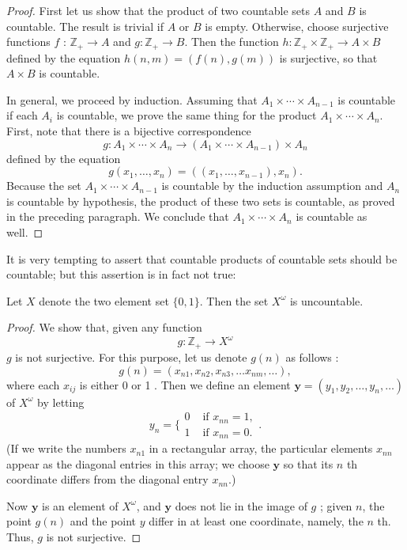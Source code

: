 \begin{proof}
 First let us show that the product of two countable sets \(A\) and \(B\) is countable. The result is trivial if \(A\) or \(B\) is empty. Otherwise, choose surjective functions \(f\) : \(\mathbb{Z}_{+} \rightarrow A\) and \(g : \mathbb{Z}_{+} \rightarrow B\). Then the function \(h : \mathbb{Z}_{+} \times {\mathbb{Z}}_{+} \rightarrow A \times B\) defined by the equation \(h({n,m}) = ({f(n),g( m) })\) is surjective, so that \(A \times B\) is countable.

 In general, we proceed by induction. Assuming that \(A_{1} \times \cdots \times {A}_{n - 1}\) is countable if each \(A_{i}\) is countable, we prove the same thing for the product \(A_{1} \times \cdots \times {A}_{n}\). First, note that there is a bijective correspondence
 \[
 g : A_{1} \times \cdots \times {A}_{n} \rightarrow ({A_{1} \times \cdots \times {A}_{n - 1}}) \times {A}_{n}
 \]
 defined by the equation
 \[
 g({x_{1},\ldots ,x_{n}}) = ({({x_{1},\ldots ,x_{n - 1}}),x_{n}}).
 \]
 Because the set \(A_{1} \times \cdots \times {A}_{n - 1}\) is countable by the induction assumption and \(A_{n}\) is countable by hypothesis, the product of these two sets is countable, as proved in the preceding paragraph. We conclude that \(A_{1} \times \cdots \times {A}_{n}\) is countable as well.

\end{proof}

It is very tempting to assert that countable products of countable sets should be countable; but this assertion is in fact not true:

\begin{theorem}
\label{thm:\thetheorem}
 Let \(X\) denote the two element set \(\{ 0,1\}\). Then the set \(X^{\omega }\) is uncountable.
\end{theorem}

\begin{proof}
 We show that, given any function
 \[
 g : \mathbb{Z}_{+} \rightarrow {X}^{\omega }
 \]
 \(g\) is not surjective. For this purpose, let us denote \(g(n)\) as follows :
 \[
 g(n) = ({x_{n1},x_{n2},x_{n3},\ldots {x}_{nm},\ldots }),
 \]
 where each \(x_{ij}\) is either 0 or 1 . Then we define an element \(\mathbf{y} = ({y_{1},y_{2},\ldots ,y_{n},\ldots })\) of \(X^{\omega }\) by letting
 \[
 y_{n} = \{ \begin{array}{ll} 0 & \text{ if }x_{nn} = 1, \\ 1 & \text{ if }x_{nn} = 0. \end{array}.
 \]
 (If we write the numbers \(x_{n1}\) in a rectangular array, the particular elements \(x_{nn}\) appear as the diagonal entries in this array; we choose \(\mathbf{y}\) so that its \(n\) th coordinate differs from the diagonal entry \(x_{nn}\).)

 Now \(\mathbf{y}\) is an element of \(X^{\omega }\), and \(\mathbf{y}\) does not lie in the image of \(g\) ; given \(n\), the point \(g(n)\) and the point \(y\) differ in at least one coordinate, namely, the \(n\) th. Thus, \(g\) is not surjective.
\end{proof}

